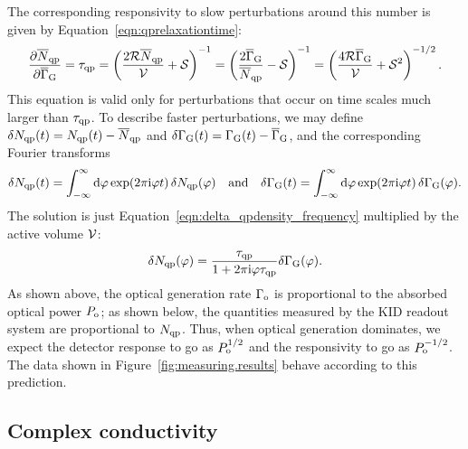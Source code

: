 The corresponding responsivity to slow perturbations around this number is given by Equation~\ref{eqn:qprelaxationtime}:
\begin{equation}
\pdv{\overline{N}_{\mathrm{qp}}}{\overline{\Gamma}_{\mathrm{G}}}
  =
  \tau_{\mathrm{qp}}
  =
  \left( \frac{2 \mathcal{R} \overline{N}_{\mathrm{qp}}}{\mathcal{V}} + \mathcal{S} \right)^{-1}
  =
  \left( \frac{2 \overline{\Gamma}_{\mathrm{G}}}{\overline{N}_{\mathrm{qp}}} - \mathcal{S} \right)^{-1}
  =
  \left( \frac{4 \mathcal{R} \overline{\Gamma}_{\mathrm{G}}}{\mathcal{V}} + \mathcal{S}^2 \right)^{-1/2}.
\label{eqn:qpnumber.responsivity}
\end{equation}
This equation is valid only for perturbations that occur on time scales much larger than $\tau_{\mathrm{qp}}$.
To describe faster perturbations, we may define
$\delta N_{\mathrm{qp}}(t) = N_{\mathrm{qp}}(t) - \overline{N}_{\mathrm{qp}}$
and 
$\delta\Gamma_{\mathrm{G}}(t) = \Gamma_{\mathrm{G}}(t) - \overline{\Gamma}_{\mathrm{G}}$, and the corresponding Fourier transforms
\begin{equation}
\delta\qpnumber(\time)
  =
  \int_{-\infty}^\infty \dd{\faudio}
  \exp(2 \pi \I \faudio \time) \, \delta\qpnumber(\faudio)
  \qqtext{and}
\delta\Rate_\generation(\time)
  =
  \int_{-\infty}^\infty \dd{\faudio}
  \exp(2 \pi \I \faudio \time) \, \delta\Rate_\generation(\faudio).
\end{equation}
The solution is just Equation~\ref{eqn:delta_qpdensity_frequency} multiplied by the active volume $\mathcal{V}$:
\begin{equation}
\delta N_{\mathrm{qp}}(\varphi)
  =
  \frac{\tau_{\mathrm{qp}}}{1 + 2 \pi \mathrm{i} \varphi \tau_{\mathrm{qp}}} \delta\Gamma_{\mathrm{G}}(\varphi).
\label{eqn:delta_qpnumber_frequency}
\end{equation}
As shown above, the optical generation rate $\Gamma_{\mathrm{o}}$ is proportional to the absorbed optical power $P_{\mathrm{o}}$;
as shown below, the quantities measured by the KID readout system are proportional to $N_{\mathrm{qp}}$.
Thus, when optical generation dominates, we expect the detector response to go as $P_{\mathrm{o}}^{1/2}$ and the responsivity to go as $P_{\mathrm{o}}^{-1/2}$.
The data shown in Figure~\ref{fig:measuring.results} behave according to this prediction.


\subsection{Complex conductivity}
\label{sec:theory.response.complex_conductivity}

